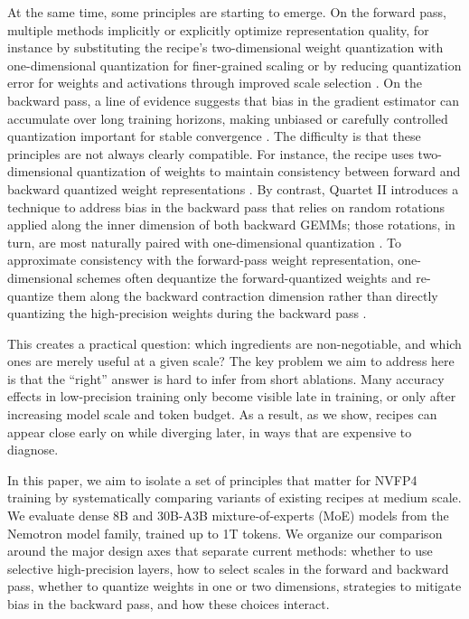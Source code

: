 At the same time, some principles are starting to emerge. On the forward pass, multiple methods implicitly or explicitly optimize representation quality, for instance by substituting the \nvrecipe{} recipe's two-dimensional weight quantization \citep{nvidia2025pretraining} with one-dimensional quantization for finer-grained scaling or by reducing quantization error for weights and activations through improved scale selection \citep{chen2025oscillationreducedmxfp4trainingvision, castro2025quartet, chen2025tetrajet, cook2025fouroversix, panferov2026quartetii}. On the backward pass, a line of evidence suggests that bias in the gradient estimator can accumulate over long training horizons, making unbiased or carefully controlled quantization important for stable convergence \citep{chmiel2024accurateneuraltraining4bit, tseng2025mxfp4, chen2025oscillationreducedmxfp4trainingvision, chmiel2025fp4all, nvidia2025pretraining, chen2025tetrajet, panferov2026quartetii}. The difficulty is that these principles are not always clearly compatible. For instance, the \nvrecipe recipe uses two-dimensional quantization of weights to maintain consistency between forward and backward quantized weight representations \citep{nvidia2025pretraining}. By contrast, Quartet II introduces a technique to address bias in the backward pass that relies on random rotations applied along the inner dimension of both backward GEMMs; those rotations, in turn, are most naturally paired with one-dimensional quantization \citep{panferov2026quartetii, tseng2025mxfp4, chen2025tetrajet}. To approximate consistency with the forward-pass weight representation, one-dimensional schemes often dequantize the forward-quantized weights and re-quantize them along the backward contraction dimension rather than directly quantizing the high-precision weights during the backward pass \citep{chen2025oscillationreducedmxfp4trainingvision, castro2025quartet, chen2025tetrajet, panferov2026quartetii}.

This creates a practical question: which ingredients are non-negotiable, and which ones are merely useful at a given scale? The key problem we aim to address here is that the ``right'' answer is hard to infer from short ablations. Many accuracy effects in low-precision training only become visible late in training, or only after increasing model scale and token budget. As a result, as we show, recipes can appear close early on while diverging later, in ways that are expensive to diagnose. 

In this paper, we aim to isolate a set of  principles that matter for NVFP4 training by systematically comparing variants of existing recipes at medium scale. We evaluate dense 8B and 30B-A3B mixture-of-experts (MoE) models from the Nemotron  model family, trained up to 1T tokens. We organize our comparison around the major design axes that separate current methods: whether to use selective high-precision layers, how to select scales in the forward and backward pass, whether to quantize weights in one or two dimensions, strategies to mitigate bias in the backward pass, and how these choices interact.

